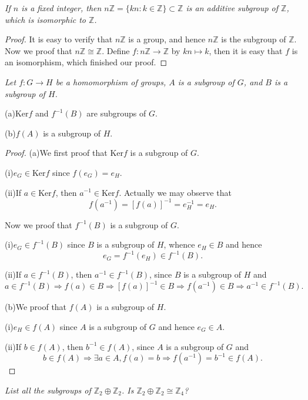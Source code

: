 \begin{problem}\em
If $n$ is a fixed integer, then $n\mathbb{Z}=\{kn:k\in\mathbb{Z}\}\subset\mathbb{Z}$ is an additive subgroup of $\mathbb{Z}$, which is isomorphic to $\mathbb{Z}$.
\end{problem}
\begin{proof}
It is easy to verify that $n\mathbb{Z}$ is a group, and hence $n\mathbb{Z}$ is the subgroup of $\mathbb{Z}$. Now we proof that $n\mathbb{Z}\cong\mathbb{Z}$. Define $f:n\mathbb{Z}\to\mathbb{Z}$ by $kn\mapsto k$, then it is easy that $f$ is an isomorphism, which finished our proof.
\end{proof}
\begin{problem}\em
Let $f:G\to H$ be a homomorphism of groups, $A$ is a subgroup of $G$, and $B$ is a subgroup of $H$.\par
(a)$\mathrm{Ker}f$ and $f^{-1}(B)$ are subgroups of $G$.\par
(b)$f(A)$ is a subgroup of $H$.
\end{problem}
\begin{proof}
(a)We first proof that $\mathrm{Ker}f$ is a subgroup of $G$.\par
(i)$e_G\in\mathrm{Ker}f$ since $f(e_G)=e_H$.\par
(ii)If $a\in\mathrm{Ker}f$, then $a^{-1}\in\mathrm{Ker}f$. Actually we may observe that 
$$f(a^{-1})=[f(a)]^{-1}=e_H^{-1}=e_H.$$\par
Now we proof that $f^{-1}(B)$ is a subgroup of $G$.\par
(i)$e_G\in f^{-1}(B)$ since $B$ is a subgroup of $H$, whence $e_H\in B$ and hence 
$$e_G=f^{-1}(e_H)\in f^{-1}(B).$$\par
(ii)If $a\in f^{-1}(B)$, then $a^{-1}\in f^{-1}(B)$, since $B$ is a subgroup of $H$ and 
$$
a\in f^{-1}\left( B \right) \Rightarrow f\left( a \right) \in B\Rightarrow \left[ f\left( a \right) \right] ^{-1}\in B\Rightarrow f\left( a^{-1} \right) \in B\Rightarrow a^{-1}\in f^{-1}\left( B \right) .
$$\par
(b)We proof that $f(A)$ is a subgroup of $H$.\par
(i)$e_H\in f(A)$ since $A$ is a subgroup of $G$ and hence $e_G\in A$.\par
(ii)If $b\in f(A)$, then $b^{-1}\in f(A)$, since $A$ is a subgroup of $G$ and 
$$
b\in f\left( A \right) \Rightarrow \exists a\in A,f\left( a \right) =b\Rightarrow f\left( a^{-1} \right) =b^{-1}\in f\left( A \right) .
$$\par
\end{proof}
\begin{problem}\em
List all the subgroups of $\mathbb{Z}_2\oplus\mathbb{Z}_2$. Is $\mathbb{Z}_2\oplus\mathbb{Z}_2\cong\mathbb{Z}_4$?
\end{problem}
